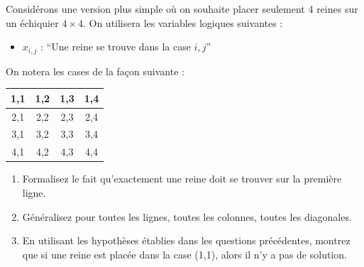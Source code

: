 \documentclass[a4paper,11pt]{article}
\begin{document}
Considérons une version plus simple où on souhaite placer seulement 4 reines sur un échiquier $4 \times 4$. On utilisera les variables logiques suivantes :
\begin{itemize}
\item $x_{i,j}$ : ``Une reine se trouve dans la case $i,j$''
\end{itemize}

On notera les cases de la façon suivante :

\begin{center}
\begin{tabular}{|c|c|c|c|}
\hline
1,1 & 1,2 & 1,3 & 1,4 \\
\hline
2,1 & 2,2 & 2,3 & 2,4 \\
\hline
3,1 & 3,2 & 3,3 & 3,4 \\
\hline
4,1 & 4,2 & 4,3 & 4,4 \\
\hline
\end{tabular}
\end{center}

\begin{enumerate}
\item Formalisez le fait qu'exactement une reine doit se trouver sur la première ligne.

\item Généralisez pour toutes les lignes, toutes les colonnes, toutes les diagonales.

\item En utilisant les hypothèses établies dans les questions précédentes, montrez que si une reine est placée dans la case (1,1), alors il n'y a pas de solution.
\end{enumerate}
\end{document}
